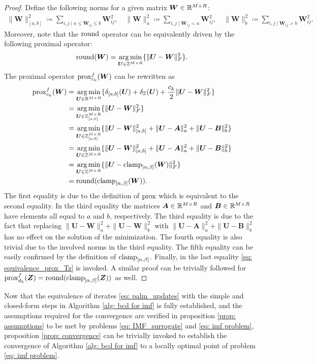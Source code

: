 \begin{proof}
    Define the following norms for a given matrix $\bm W \in \mathbb{R}^{M\times R}$:
    \begin{align*}
        \|\bm W\|_{[a,b]}^2 \coloneqq \sum_{i,j \mid a \leq \bm W_{ij} \leq b} \bm W_{ij}^2, \quad 
        \|\bm W\|_a^2 \coloneqq \sum_{i,j \mid \bm W_{ij} < a} \bm W_{ij}^2, \quad 
        \|\bm W\|_b^2 \coloneqq \sum_{i,j \mid \bm W_{ij} > b} \bm W_{ij}^2.
    \end{align*}
    Moreover, note that the $\operatorname{round}$ operator  can be equivalently driven by the following proximal operator:
    \begin{equation}
        \operatorname{round}(\bm W) = \operatorname*{arg\,min}_{\bm U \in \mathbb Z^{M\times R}}\{\|\bm U - \bm W\|^2_F\}.
        \label{eq: equivalence_prox_Tz}
    \end{equation}
    The proximal operator $\operatorname{prox}^f_{c_k}(\bm W)$ can be rewritten as
    \begin{align*}
        \operatorname{prox}^f_{c_k}(\bm W) &= \operatorname*{arg\,min}_{\bm U \in \mathbb{R}^{M\times R}}\{\delta_{[a,b]}(\bm U) + \delta_{\mathbb Z}(\bm U) + \frac{c_k}{2} \|\bm U - \bm W\|^2_F\}\\
        &= \operatorname*{arg\,min}_{\bm U \in \mathbb Z_{[a,b]}^{M\times R}}\{\|\bm U - \bm W\|^2_F\}\\
        &= \operatorname*{arg\,min}_{\bm U \in \mathbb Z_{[a,b]}^{M\times R}}\{\|\bm U - \bm W\|^2_{[a,b]} + \|\bm U - \bm A\|^2_a + \|\bm U - \bm B\|^2_b\}\\
        &= \operatorname*{arg\,min}_{\bm U \in \mathbb Z^{M\times R}}\{\|\bm U - \bm W\|^2_{[a,b]} + \|\bm U - \bm A\|^2_a + \|\bm U - \bm B\|^2_b\}\\
        &= \operatorname*{arg\,min}_{\bm U \in \mathbb Z^{M\times R}}\{\|\bm U - \operatorname{clamp}_{[\alpha,\beta]}(\bm W)\|^2_F\}\\
        &= \operatorname{round}(\operatorname{clamp}_{[\alpha,\beta]}(\bm W)).
    \end{align*}
    The first equality is due to the definition of $\operatorname{prox}$ which is equivalent to the second equality. 
    In the third equality the matrices $\bm A\in\mathbb{R}^{M\times R}$ and $\bm B\in\mathbb{R}^{M\times R}$ have elements all equal to $a$ and $b$, respectively.
    The third equality is due to the fact that replacing $\|\bm U - \bm W\|^2_a + \|\bm U - \bm W\|^2_b$ with $\|\bm U - \bm A\|^2_a + \|\bm U - \bm B\|^2_b$ has no effect on the solution of the minimization. The fourth equality is also trivial due to the involved norms in the third equality. The fifth equality can be easily confirmed by the definition of $\operatorname{clamp}_{[\alpha,\beta]}$. Finally, in the last equality \eqref{eq: equivalence_prox_Tz} is invoked. A similar proof can be trivially followed for $\operatorname{prox}^f_{d_k}(\bm Z) = \operatorname{round}(\operatorname{clamp}_{[\alpha,\beta]}(\bm Z))$ as well.
\end{proof}
Now that the equivalence of iterates \eqref{eq: palm_updates} with the simple and closed-form steps in Algorithm \ref{alg: bcd for imf} is fully established, and the assumptions required for the convergence are verified in proposition \ref{prop: assumptions} to be met by problems \eqref{eq: IMF_surrogate} and \eqref{eq: imf problem}, proposition \ref{prop: convergence} can be trivially invoked to establish the convergence of Algorithm \ref{alg: bcd for imf} to a locally optimal point of problem \eqref{eq: imf problem}.


